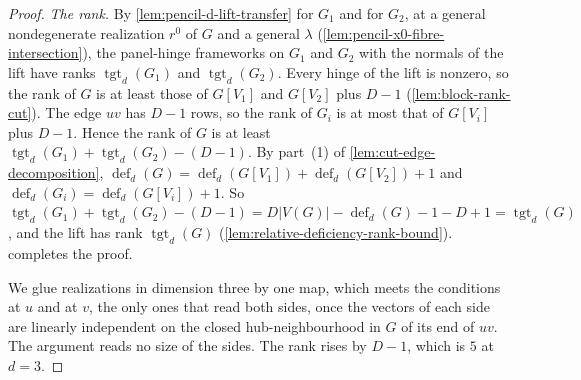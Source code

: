 \begin{proof}
  \emph{The rank.} By \cref{lem:pencil-d-lift-transfer} for $G_1$ and for
  $G_2$, at a general nondegenerate realization $r^0$ of $G$ and a general
  $\lambda$ (\cref{lem:pencil-x0-fibre-intersection}), the panel-hinge
  frameworks on $G_1$ and $G_2$ with the normals of the lift have ranks
  $\operatorname{tgt}_d(G_1)$ and $\operatorname{tgt}_d(G_2)$. Every
  hinge of the lift is nonzero, so the rank of $G$ is at least those of
  $G[V_1]$ and $G[V_2]$ plus $D - 1$ (\cref{lem:block-rank-cut}). The edge
  $uv$ has $D - 1$ rows, so the rank of $G_i$ is at most that of
  $G[V_i]$ plus $D - 1$. Hence the rank of $G$ is at least
  $\operatorname{tgt}_d(G_1) + \operatorname{tgt}_d(G_2) - (D - 1)$. By
  part~(1) of \cref{lem:cut-edge-decomposition},
  $\operatorname{def}_d(G) = \operatorname{def}_d(G[V_1]) +
  \operatorname{def}_d(G[V_2]) + 1$ and $\operatorname{def}_d(G_i) =
  \operatorname{def}_d(G[V_i]) + 1$. So
  $\operatorname{tgt}_d(G_1) + \operatorname{tgt}_d(G_2) - (D - 1) =
  D|V(G)| - \operatorname{def}_d(G) - 1 - D + 1 =
  \operatorname{tgt}_d(G)$, and the lift has rank
  $\operatorname{tgt}_d(G)$ (\cref{lem:relative-deficiency-rank-bound}).
   completes the proof.

  We glue realizations in dimension three by one map,
  which meets the conditions at $u$ and at $v$, the only ones that read
  both sides, once the vectors of each side are linearly independent on
  the closed hub-neighbourhood in $G$ of its end of $uv$. The argument
  reads no size of the sides. The rank rises by $D - 1$, which is $5$ at
  $d = 3$.
\end{proof}

